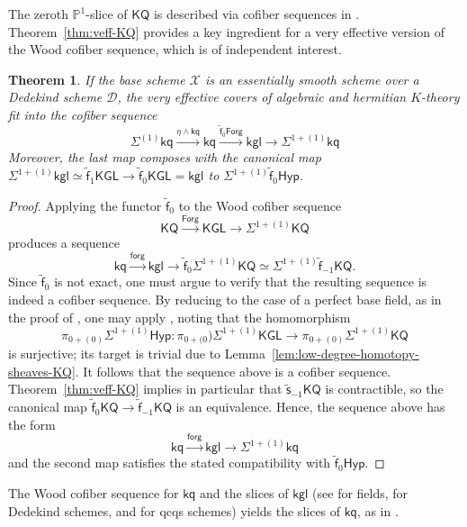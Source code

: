 \documentclass[11pt,hyp,english]{article}
\newcommand{\KGL}{\mathsf{KGL}}
\newcommand{\kgl}{\mathsf{kgl}}
\newcommand{\KQ}{\mathsf{KQ}}
\newcommand{\kq}{\mathsf{kq}}
\newcommand{\vs}{\tilde{\mathsf{s}}}
\newcommand{\vf}{\tilde{{\mathsf{f}}}}
\newcommand{\Forg}{\mathsf{Forg}}
\newcommand{\Hyper}{\mathsf{Hyp}}
\newcommand{\forg}{\mathsf{forg}}
\let\smash=\wedge
\newtheorem{theorem}{Theorem}[section]
\theoremstyle{definition}
\begin{document}
The zeroth $\mathbb{P}^1$-slice of $\KQ$ is described via cofiber sequences in . Theorem~\ref{thm:veff-KQ} provides a key ingredient for a very effective version of the Wood cofiber sequence, which is of independent interest.


\begin{theorem}
\label{thm:woodkq}
If the base scheme $\mathcal{X}$ is an essentially smooth scheme over a Dedekind scheme $\mathcal{D}$, 
the very effective covers of algebraic and hermitian $K$-theory fit into the cofiber sequence
\[ 
\Sigma^{(1)}\kq \xrightarrow{\eta\smash \kq} 
\kq \xrightarrow{\vf_0\Forg} \kgl \to 
\Sigma^{1+(1)} \kq
\]
Moreover, 
the last map composes with the canonical map $\Sigma^{1+(1)}\kgl \simeq \vf_1\KGL \to \vf_0\KGL = \kgl$ to 
$\Sigma^{1+(1)}\vf_0\Hyper$.
\end{theorem}

\begin{proof}
Applying the functor $\vf_0$ to the Wood cofiber sequence
\[ \KQ \xrightarrow{\Forg}\KGL \to \Sigma^{1+(1)}\KQ\]
produces a sequence
\[ \kq \xrightarrow{\forg}\kgl \to \vf_0\Sigma^{1+(1)}\KQ\simeq \Sigma^{1+(1)}\vf_{-1}\KQ.\]
Since $\vf_0$ is not exact, one must argue to verify that the resulting sequence is indeed a cofiber sequence. By reducing to the case of a perfect base field, as in the proof of , one may apply \cite[Lemmas 10 and 15]{Bachmann}, noting that the homomorphism
\[\pi_{0+(0)}\Sigma^{1+(1)}\Hyper\colon \pi_{0+(0})\Sigma^{1+(1)}\KGL \to \pi_{0+(0)}\Sigma^{1+(1)}\KQ\] 
is surjective; its target is trivial due to Lemma~\ref{lem:low-degree-homotopy-sheaves-KQ}.
It follows that the sequence above is a cofiber sequence.
Theorem~\ref{thm:veff-KQ} implies in particular that $\vs_{-1}\KQ$ is contractible, so the canonical map $\vf_0\KQ \to \vf_{-1}\KQ$ is an equivalence.
Hence, the sequence above has the form
\[ \kq \xrightarrow{\forg}\kgl\to \Sigma^{1+(1)}\kq \]
and the second map satisfies the stated compatibility with $\vf_0\Hyper$.
\end{proof}

The Wood cofiber sequence for $\kq$ and the slices of $\kgl$ (see \cite{levine.homotopy-coniveau} for fields, \cite{bachmann.jems} for Dedekind schemes, and \cite{bem.kglslices} for qcqs schemes) yields the slices of $\kq$, as in \cite[Theorem 17]{aro}.
\end{document}
